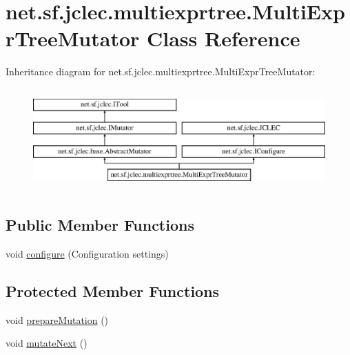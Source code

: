 \hypertarget{classnet_1_1sf_1_1jclec_1_1multiexprtree_1_1_multi_expr_tree_mutator}{\section{net.\-sf.\-jclec.\-multiexprtree.\-Multi\-Expr\-Tree\-Mutator Class Reference}
\label{classnet_1_1sf_1_1jclec_1_1multiexprtree_1_1_multi_expr_tree_mutator}
}
Inheritance diagram for net.\-sf.\-jclec.\-multiexprtree.\-Multi\-Expr\-Tree\-Mutator\-:\begin{figure}[H]
\begin{center}
\leavevmode
\includegraphics[height=3.943662cm]{classnet_1_1sf_1_1jclec_1_1multiexprtree_1_1_multi_expr_tree_mutator}
\end{center}
\end{figure}
\subsection*{Public Member Functions}
\begin{DoxyCompactItemize}
\item 
void \hyperlink{classnet_1_1sf_1_1jclec_1_1multiexprtree_1_1_multi_expr_tree_mutator_a75616ff8f7853621d29cb69a65a96e4a}{configure} (Configuration settings)
\end{DoxyCompactItemize}
\subsection*{Protected Member Functions}
\begin{DoxyCompactItemize}
\item 
void \hyperlink{classnet_1_1sf_1_1jclec_1_1multiexprtree_1_1_multi_expr_tree_mutator_a0793d815841d004beaaa9acb66659e87}{prepare\-Mutation} ()
\item 
void \hyperlink{classnet_1_1sf_1_1jclec_1_1multiexprtree_1_1_multi_expr_tree_mutator_a4a3637da6427be21eb5804a45f0a2ce7}{mutate\-Next} ()
\end{DoxyCompactItemize}
